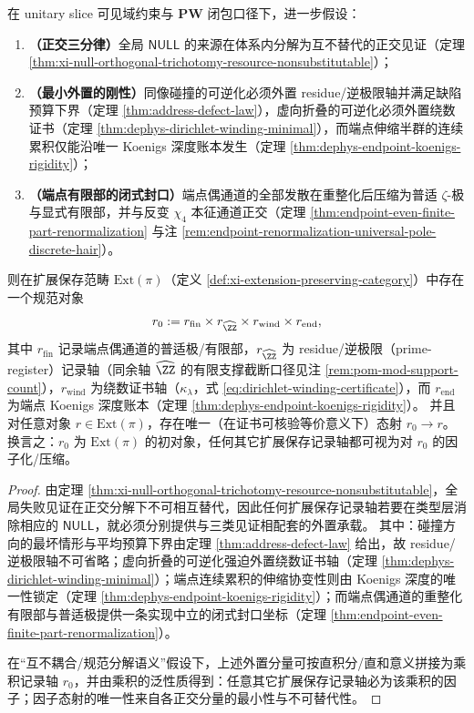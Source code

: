 \begin{theorem}[扩展保存范畴的初对象与规范记录轴]\label{thm:xi-extension-preserving-initial-object}
在 unitary slice 可见域约束与 \(\mathbf{PW}\) 闭包口径下，进一步假设：
\begin{enumerate}
  \item \textbf{（正交三分律）}全局 \(\mathsf{NULL}\) 的来源在体系内分解为互不替代的正交见证（定理 \ref{thm:xi-null-orthogonal-trichotomy-resource-nonsubstitutable}）；
  \item \textbf{（最小外置的刚性）}同像碰撞的可逆化必须外置 residue/逆极限轴并满足缺陷预算下界（定理 \ref{thm:address-defect-law}），虚向折叠的可逆化必须外置绕数证书（定理 \ref{thm:dephys-dirichlet-winding-minimal}），而端点伸缩半群的连续累积仅能沿唯一 Koenigs 深度账本发生（定理 \ref{thm:dephys-endpoint-koenigs-rigidity}）；
  \item \textbf{（端点有限部的闭式封口）}端点偶通道的全部发散在重整化后压缩为普适 \(\zeta\)-极与显式有限部，并与反变 \(\chi_4\) 本征通道正交（定理 \ref{thm:endpoint-even-finite-part-renormalization} 与注 \ref{rem:endpoint-renormalization-universal-pole-discrete-hair}）。
\end{enumerate}
则在扩展保存范畴 \(\mathrm{Ext}(\pi)\)（定义 \ref{def:xi-extension-preserving-category}）中存在一个规范对象
\[
r_0
:=
r_{\mathrm{fin}}\times r_{\widehat{\ZZ}}\times r_{\mathrm{wind}}\times r_{\mathrm{end}},
\]
其中 \(r_{\mathrm{fin}}\) 记录端点偶通道的普适极/有限部，\(r_{\widehat{\ZZ}}\) 为 residue/逆极限（prime-register）记录轴（同余轴 \(\widehat{\ZZ}\) 的有限支撑截断口径见注 \ref{rem:pom-mod-support-count}），\(r_{\mathrm{wind}}\) 为绕数证书轴（\(\kappa_\lambda\)，式 \eqref{eq:dirichlet-winding-certificate}），而 \(r_{\mathrm{end}}\) 为端点 Koenigs 深度账本（定理 \ref{thm:dephys-endpoint-koenigs-rigidity}）。
并且对任意对象 \(r\in\mathrm{Ext}(\pi)\)，存在唯一（在证书可核验等价意义下）态射 \(r_0\to r\)。
换言之：\(r_0\) 为 \(\mathrm{Ext}(\pi)\) 的初对象，任何其它扩展保存记录轴都可视为对 \(r_0\) 的因子化/压缩。
\end{theorem}

\begin{proof}
由定理 \ref{thm:xi-null-orthogonal-trichotomy-resource-nonsubstitutable}，全局失败见证在正交分解下不可相互替代，因此任何扩展保存记录轴若要在类型层消除相应的 \(\mathsf{NULL}\)，就必须分别提供与三类见证相配套的外置承载。
其中：碰撞方向的最坏情形与平均预算下界由定理 \ref{thm:address-defect-law} 给出，故 residue/逆极限轴不可省略；虚向折叠的可逆化强迫外置绕数证书轴（定理 \ref{thm:dephys-dirichlet-winding-minimal}）；端点连续累积的伸缩协变性则由 Koenigs 深度的唯一性锁定（定理 \ref{thm:dephys-endpoint-koenigs-rigidity}）；而端点偶通道的重整化有限部与普适极提供一条实现中立的闭式封口坐标（定理 \ref{thm:endpoint-even-finite-part-renormalization}）。
\par
在“互不耦合/规范分解语义”假设下，上述外置分量可按直积分/直和意义拼接为乘积记录轴 \(r_0\)，并由乘积的泛性质得到：任意其它扩展保存记录轴必为该乘积的因子；因子态射的唯一性来自各正交分量的最小性与不可替代性。
\end{proof}

